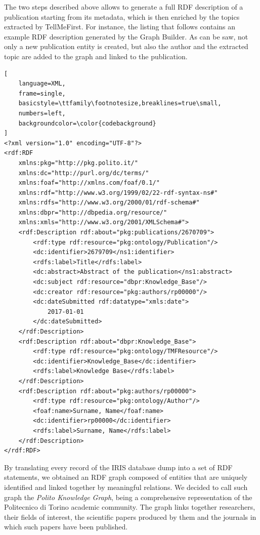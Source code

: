 \documentclass[%
    corpo=13.5pt,
    twoside,
    oldstyle,
    tipotesi=magistrale,
    greek,
    evenboxes
]{toptesi}
\begin{document}
The two steps described above allows to generate a full RDF description of a
publication starting from its metadata, which is then enriched by the topics
extracted by TellMeFirst.
For instance, the listing that follows contains an example RDF description
generated by the Graph Builder. As can be saw, not only a new
publication entity is created, but also the author and the extracted topic are
added to the graph and linked to the publication.

\begin{lstlisting}[
    language=XML,
    frame=single,
    basicstyle=\ttfamily\footnotesize,breaklines=true\small,
    numbers=left,
    backgroundcolor=\color{codebackground}
]
<?xml version="1.0" encoding="UTF-8"?>
<rdf:RDF
    xmlns:pkg="http://pkg.polito.it/"
    xmlns:dc="http://purl.org/dc/terms/"
    xmlns:foaf="http://xmlns.com/foaf/0.1/"
    xmlns:rdf="http://www.w3.org/1999/02/22-rdf-syntax-ns#"
    xmlns:rdfs="http://www.w3.org/2000/01/rdf-schema#"
    xmlns:dbpr="http://dbpedia.org/resource/"
    xmlns:xmls="http://www.w3.org/2001/XMLSchema#">
    <rdf:Description rdf:about="pkg:publications/2670709">
        <rdf:type rdf:resource="pkg:ontology/Publication"/>
        <dc:identifier>2679709</ns1:identifier>
        <rdfs:label>Title</rdfs:label>
        <dc:abstract>Abstract of the publication</ns1:abstract>
        <dc:subject rdf:resource="dbpr:Knowledge_Base"/>
        <dc:creator rdf:resource="pkg:authors/rp00000"/>
        <dc:dateSubmitted rdf:datatype="xmls:date">
            2017-01-01
        </dc:dateSubmitted>
    </rdf:Description>
    <rdf:Description rdf:about="dbpr:Knowledge_Base">
        <rdf:type rdf:resource="pkg:ontology/TMFResource"/>
        <dc:identifier>Knowledge_Base</dc:identifier>
        <rdfs:label>Knowledge Base</rdfs:label>
    </rdf:Description>
    <rdf:Description rdf:about="pkg:authors/rp00000">
        <rdf:type rdf:resource="pkg:ontology/Author"/>
        <foaf:name>Surname, Name</foaf:name>
        <dc:identifier>rp00000</dc:identifier>
        <rdfs:label>Surname, Name</rdfs:label>
    </rdf:Description>
</rdf:RDF>
\end{lstlisting}

\newpage

By translating every record of the IRIS database dump into a set of
RDF statements, we obtained an RDF graph composed of entities that are uniquely
identified and linked together by meaningful relations.
We decided to call such graph the \emph{Polito Knowledge Graph}, being a
comprehensive representation of the Politecnico di Torino academic community.
The graph links together researchers, their fields of interest, the scientific
papers produced by them and the journals in which such papers have been
published.
\end{document}
